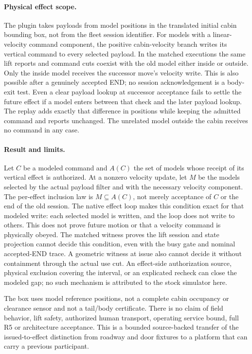 \documentclass[11pt]{article}
\begin{document}
\paragraph{Physical effect scope.}
The plugin takes payloads from model positions in the translated
initial cabin bounding box, not from the fleet session identifier.
For models with a linear-velocity command component, the positive
cabin-velocity branch writes its vertical command to every selected
payload. In the matched executions the same lift reports and command
cuts coexist with the old model either inside or outside. Only the
inside model receives the successor move's velocity write. This is
also possible after a genuinely accepted END; no session
acknowledgement is a body-exit test. Even a clear payload lookup
at successor acceptance fails to settle the future effect if a model
enters between that check and the later payload lookup. The replay
adds exactly that difference in positions while keeping the admitted
command and reports unchanged. The unrelated model outside the
cabin receives no command in any case.

\paragraph{Result and limits.}
Let $C$ be a modeled command and $A(C)$ the set of models whose
receipt of its vertical effect is authorized. At a nonzero velocity
update, let $M$ be the models selected by the actual payload filter
and with the necessary velocity component. The per-effect inclusion
law is $M\subseteq A(C)$, not merely acceptance of $C$ or the end of
the old session. The native effect loop makes this condition exact
for that modeled write: each selected model is written, and the
loop does not write to others. This does not prove future motion
or that a velocity command is physically obeyed.
The matched witness proves the lift session and state projection
cannot decide this condition, even with the busy gate and nominal
accepted-END trace. A geometric witness at issue also cannot decide
it without containment through the actual use cut. An effect-side
authorization source, physical exclusion covering the interval,
or an explicated recheck can close the modeled gap; no such
mechanism is attributed to the stock simulator here.

The box uses model reference positions, not a complete cabin
occupancy or clearance sensor and not a tail/body certificate.
There is no claim of field behavior, lift safety, authorized
human transport, operating service bound, full R5 or architecture
acceptance. This is a bounded source-backed transfer of the
issued-to-effect distinction from roadway and door fixtures to
a platform that can carry a previous participant.
\end{document}
